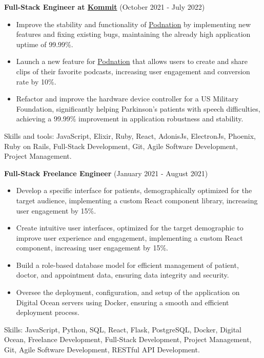   \vspace*{0.2cm}
  \textbf{Full-Stack Engineer at \href{https://kommit.co/}{Kommit}} (October 2021 - July 2022)
  \hfill
  \vspace*{0.2cm}
  \begin{minipage}{\linewidth}
    \begin{itemize}[noitemsep]
      \item Improve the stability and functionality of \href{https://www.podnation.co/}{Podnation} by implementing new features and fixing existing bugs, maintaining the already high application uptime of 99.99\%.
      \item Launch a new feature for \href{https://www.podnation.co/}{Podnation} that allows users to create and share clips of their favorite podcasts, increasing user engagement and conversion rate by 10\%.
      \item Refactor and improve the hardware device controller for a US Military Foundation, significantly helping Parkinson's patients with speech difficulties, achieving a 99.99\% improvement in application robustness and stability.
    \end{itemize}
    \hfill
  \end{minipage}
  Skills and tools: JavaScript, Elixir, Ruby, React, AdonisJs, ElectronJs, Phoenix, Ruby on Rails, Full-Stack Development, Git, Agile Software Development, Project Management.

  \vspace*{0.2cm}
  \textbf{Full-Stack Freelance Engineer} (January 2021 - August 2021)
  \hfill
  \vspace*{0.2cm}
  \begin{minipage}{\linewidth}
    \begin{itemize}[noitemsep]
      \item Develop a specific interface for patients, demographically optimized for the target audience, implementing a custom React component library, increasing user engagement by 15\%.
      \item Create intuitive user interfaces, optimized for the target demographic to improve user experience and engagement, implementing a custom React component, increasing user engagement by 15\%.
      \item Build a role-based database model for efficient management of patient, doctor, and appointment data, ensuring data integrity and security.
      \item Oversee the deployment, configuration, and setup of the application on Digital Ocean servers using Docker, ensuring a smooth and efficient deployment process.
    \end{itemize}
    \hfill
  \end{minipage}
  Skills: JavaScript, Python, SQL, React, Flask, PostgreSQL, Docker, Digital Ocean, Freelance Development, Full-Stack Development, Project Management, Git, Agile Software Development, RESTful API Development.

